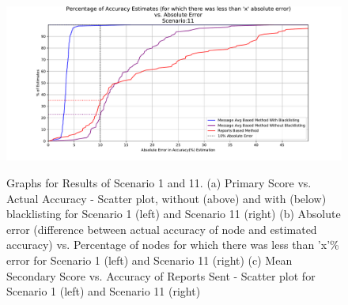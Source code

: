 \documentclass[journal]{IEEEtran}
\begin{document}
\begin{figure}[!ht]
{		\includegraphics[width=0.5\linewidth, trim={80 25 90 50}, clip]{images/SCN11_AbsoluteErrorsInEstimationComparison.pdf}
	}
	\hfill
	\caption{Graphs for Results of Scenario 1 and 11. (a) Primary Score vs. Actual Accuracy - Scatter plot, without (above) and with (below) blacklisting for Scenario 1 (left) and Scenario 11 (right) (b) Absolute error (difference between actual accuracy of node and estimated accuracy) vs. Percentage of nodes for which there was less than 'x'\% error for Scenario 1 (left) and Scenario 11 (right) (c) Mean Secondary Score vs. Accuracy of Reports Sent - Scatter plot for Scenario 1 (left) and Scenario 11 (right)}
	\label{fig:apdx:ev1}
\end{figure}
\end{document}
